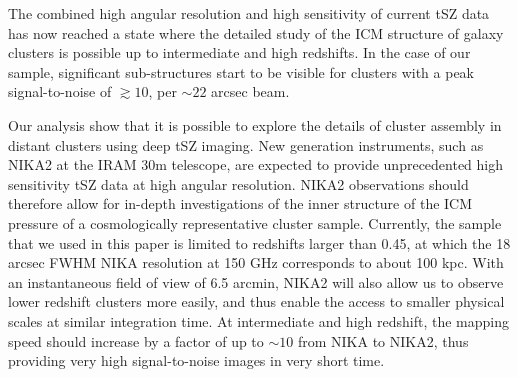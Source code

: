 \documentclass[twocolumn,traditabstract]{aa}
\begin{document}
The combined high angular resolution and high sensitivity of current tSZ data has now reached a state where the detailed study of the ICM structure of galaxy clusters is possible up to intermediate and high redshifts. In the case of our sample, significant sub-structures start to be visible for clusters with a peak signal-to-noise of $\gtrsim 10$, per $\sim 22$ arcsec beam.

Our analysis show that it is possible to explore the details of cluster assembly in distant clusters using deep tSZ imaging. New generation instruments, such as NIKA2 \citep{Calvo2016,Catalano2016} at the IRAM 30m telescope, are expected to provide unprecedented high sensitivity tSZ data at high angular resolution. NIKA2 observations \citep[such as the ones of the tSZ large program,][]{Comis2016} should therefore allow for in-depth investigations of the inner structure of the ICM pressure of a cosmologically representative cluster sample. Currently, the sample that we used in this paper is limited to redshifts larger than 0.45, at which the 18 arcsec FWHM NIKA resolution at 150 GHz corresponds to about 100 kpc. With an instantaneous field of view of 6.5 arcmin, NIKA2 will also allow us to observe lower redshift clusters more easily, and thus enable the access to smaller physical scales at similar integration time. At intermediate and high redshift, the mapping speed should increase by a factor of up to $\sim 10$ from NIKA to NIKA2, thus providing very high signal-to-noise images in very short time.
\end{document}
